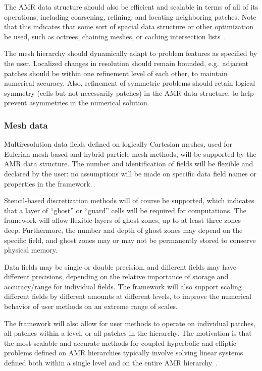 \documentclass[10pt,twocolumn]{article}
\begin{document}
The AMR data structure should also be efficient and scalable in terms
of all of its operations, including coarsening, refining, and locating
neighboring patches.  Note that this indicates that some sort of
spacial data structure or other optimization be used, such as octrees,
chaining meshes, or caching intersection lists~\cite{StSh09}.

The mesh hierarchy should dynamically adapt to problem features as
specified by the user.  Localized changes in resolution should remain
bounded, e.g.~adjacent patches should be within one refinement
level of each other, to maintain numerical accuracy.  Also, refinement
of symmetric problems should retain logical symmetry (cells but not
necessarily patches) in the AMR data structure, to help prevent
asymmetries in the numerical solution.


\subsubsection{Mesh data} \label{sss:require-fields}

Multiresolution data fields defined on logically Cartesian meshes,
used for Eulerian mesh-based and hybrid particle-mesh methods, will be
supported by the AMR data structure.  The number and identification of
fields will be flexible and declared by the user: no assumptions will
be made on specific data field names or properties in the framework.

Stencil-based discretization methods will of course be supported,
which indicates that a layer of ``ghost'' or ``guard'' cells will be
required for computations.  The framework will allow flexible layers
of ghost zones, up to at least three zones deep.  Furthermore, the
number and depth of ghost zones may depend on the specific field, and
ghost zones may or may not be permanently stored to conserve physical
memory.

Data fields may be single or double precision, and different fields
may have different precisions, depending on the relative importance of
storage and accuracy/range for individual fields.  The framework will
also support scaling different fields by different amounts at
different levels, to improve the numerical behavior of user methods on
an extreme range of scales.

The framework will also allow for user methods to operate on
individual patches, all patches within a level, or all patches in the
hierarchy.  The motivation is that the most scalable and accurate
methods for coupled hyperbolic and elliptic problems defined on AMR
hierarchies typically involve solving linear systems defined both
within a single level and on the entire AMR hierarchy~\cite{MiCo07}.
\end{document}

